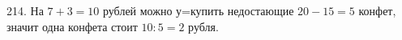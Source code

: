 214. На $7+3=10$ рублей можно у=купить недостающие  $20-15=5$ конфет, значит одна конфета стоит $10:5=2$ рубля.\\
